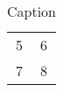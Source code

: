\begin{table}[!h]
    \centering
    \begin{tabular}{c|c}
        5 & 6 \\
        7 & 8
    \end{tabular}
    \caption{Caption}
    \label{table:appendix_introduction}
\end{table}